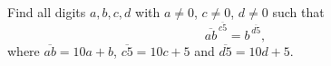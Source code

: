 Find all digits $a,b,c,d$ with $a\ne0$, $c\ne0$, $d\ne0$ such that
\[
\overline{ab}^{\,\overline{c5}}=b^{\,\overline{d5}},
\]
where $\overline{ab}=10a+b$, $\overline{c5}=10c+5$ and $\overline{d5}=10d+5$.
